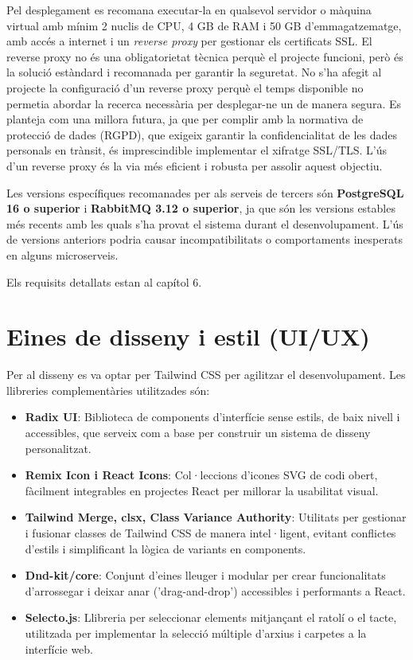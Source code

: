 Pel desplegament es recomana executar-la en qualsevol servidor o màquina virtual amb mínim 2 nuclis de CPU, 4 GB de RAM i 50 GB d'emmagatzematge, amb accés a internet i un \textit{reverse proxy} per gestionar els certificats SSL. El reverse proxy no és una obligatorietat tècnica perquè el projecte funcioni, però és la solució estàndard i recomanada per garantir la seguretat. No s'ha afegit al projecte la configuració d'un reverse proxy perquè el temps disponible no permetia abordar la recerca necessària per desplegar-ne un de manera segura. Es planteja com una millora futura, ja que per complir amb la normativa de protecció de dades (RGPD), que exigeix garantir la confidencialitat de les dades personals en trànsit, és imprescindible implementar el xifratge SSL/TLS. L'ús d'un reverse proxy és la via més eficient i robusta per assolir aquest objectiu.

Les versions específiques recomanades per als serveis de tercers són \textbf{PostgreSQL 16 o superior} i \textbf{RabbitMQ 3.12 o superior}, ja que són les versions estables més recents amb les quals s'ha provat el sistema durant el desenvolupament. L'ús de versions anteriors podria causar incompatibilitats o comportaments inesperats en alguns microserveis.

Els requisits detallats estan al capítol 6.

\section{Eines de disseny i estil (UI/UX)}
Per al disseny es va optar per Tailwind CSS per agilitzar el desenvolupament. Les llibreries complementàries utilitzades són:

\begin{itemize}
\item \textbf{Radix UI}: Biblioteca de components d'interfície sense estils, de baix nivell i accessibles, que serveix com a base per construir un sistema de disseny personalitzat.
\item \textbf{Remix Icon i React Icons}: Col·leccions d'icones SVG de codi obert, fàcilment integrables en projectes React per millorar la usabilitat visual.
\item \textbf{Tailwind Merge, clsx, Class Variance Authority}: Utilitats per gestionar i fusionar classes de Tailwind CSS de manera intel·ligent, evitant conflictes d'estils i simplificant la lògica de variants en components.
\item \textbf{Dnd-kit/core}: Conjunt d'eines lleuger i modular per crear funcionalitats d'arrossegar i deixar anar ('drag-and-drop') accessibles i performants a React.
\item \textbf{Selecto.js}: Llibreria per seleccionar elements mitjançant el ratolí o el tacte, utilitzada per implementar la selecció múltiple d'arxius i carpetes a la interfície web.
\end{itemize}

